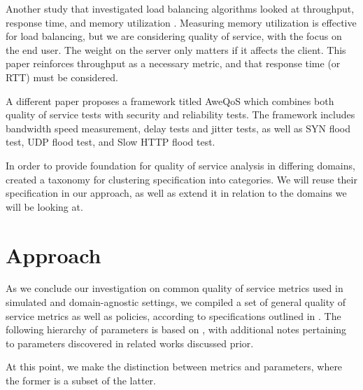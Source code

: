 \documentclass{article}
\begin{document}
Another study that investigated load balancing algorithms looked at throughput, response time, and memory utilization \cite{babbar_2022}. Measuring memory utilization 
is effective for load balancing, but we are considering quality of service, with the focus on the end user. The weight on the server only matters if it affects the 
client. This paper reinforces throughput as a necessary metric, and that response time (or RTT) must be considered. 

A different paper \cite{AweQoS_2020} proposes a framework titled AweQoS which combines both quality of service tests with security and reliability tests. The framework 
includes bandwidth speed measurement, delay tests and jitter tests, as well as SYN flood test, UDP flood test, and Slow HTTP flood test. 

In order to provide foundation for quality of service analysis in differing domains, \cite{taxonomy} created a taxonomy for clustering specification into categories. 
We will reuse their specification in our approach, as well as extend it in relation to the domains we will be looking at. 


\section{Approach}
As we conclude our investigation on common quality of service metrics used in simulated and domain-agnostic settings, we compiled a set of general quality of service 
metrics as well as policies, according to specifications outlined in \cite{taxonomy}. The following hierarchy of parameters is based on \cite{taxonomy}, with additional 
notes pertaining to parameters discovered in related works discussed prior.

At this point, we make the distinction between metrics and parameters, where the former is a subset of the latter.
\end{document}
